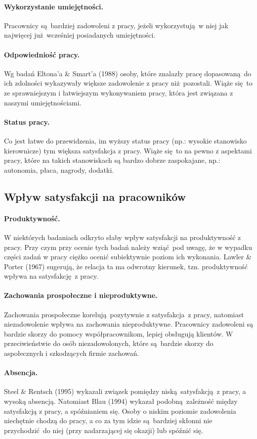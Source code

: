 \paragraph{Wykorzystanie umiejętności.} Pracownicy są bardziej zadowoleni z pracy, jeżeli wykorzystują w niej jak najwięcej już wcześniej posiadanych umiejętności.
\paragraph{Odpowiedniość pracy.} Wg badań Eltona'a \& Smart'a (1988) osoby, które znalazły pracę dopasowaną do ich zdolności wykazywały większe zadowolenie z pracy niż pozostali. Wiąże się to ze sprawniejszym i łatwiejszym wykonywaniem pracy, która jest związana z naszymi umiejętnościami.
\paragraph{Status pracy.} Co jest łatwe do przewidzenia, im wyższy status pracy (np.: wysokie stanowisko kierownicze) tym większa satysfakcja z pracy. Wiąże się to na pewno z aspektami pracy, które na takich stanowiskach są bardzo dobrze zaspokajane, np.: autonomia, płaca, nagrody, dodatki.

\subsection{Wpływ satysfakcji na pracowników}
\paragraph{Produktywność.} W niektórych badaniach odkryto słaby wpływ satysfakcji na produktywność z pracy. Przy czym przy ocenie tych badań należy wziąć pod uwagę, że w wypadku części zadań w pracy ciężko ocenić subiektywnie poziom ich wykonania. Lawler \& Porter (1967) sugerują, że relacja ta ma odwrotny kierunek, tzn. produktywność wpływa na satysfakcję z pracy.
\paragraph{Zachowania prospołeczne i nieproduktywne.} Zachowania prospołeczne korelują pozytywnie z satysfakcja z pracy, natomiast niezadowolenie wpływa na zachowania nieproduktywne. Pracownicy zadowoleni są bardzie skorzy do pomocy współpracownikom, lepiej obsługują klientów. W przeciwieństwie do osób niezadowolonych, które są bardzie skorzy do aspołecznych i szkodzących firmie zachowań.
\paragraph{Absencja.} Steel \& Rentsch (1995) wykazali związek pomiędzy niską satysfakcją z pracy, a wysoką absencją. Natomiast Blau (1994) wykazał podobną zależność między satysfakcją z pracy, a spóźnianiem się. Osoby o niskim poziomie zadowolenia niechętnie chodzą do pracy, a co za tym idzie są bardziej skłonni nie przychodzić do niej (przy nadarzającej się okazji) lub spóźnić się.
